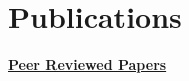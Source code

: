 \documentclass[11pt, letterpaper, roman]{moderncv} %
\begin{document}


\section{Publications}

\noindent\underline{\textbf{Peer Reviewed Papers}}
\vspace{4pt}
\end{document}
